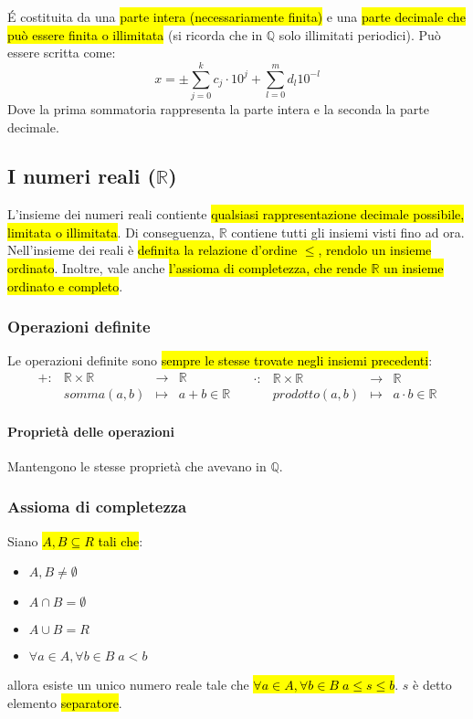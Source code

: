 \'E costituita da una \hl{parte intera (necessariamente finita)} e una \hl{parte
decimale che può essere finita o illimitata} (si ricorda che in $\mathbb{Q}$ solo
illimitati periodici). Può essere scritta come:
\[ x = \pm \sum_{j=0}^k c_j \cdot 10^j + \sum_{l=0}^m d_l 10^{-l} \]
Dove la prima sommatoria rappresenta la parte intera e la seconda la parte 
decimale.

\subsection{I numeri reali ($\mathbb{R}$)}
L'insieme dei numeri reali contiente \hl{qualsiasi rappresentazione decimale
possibile, limitata o illimitata}. Di conseguenza, $\mathbb{R}$ contiene tutti
gli insiemi visti fino ad ora. Nell'insieme dei reali è \hl{definita la relazione
d'ordine $\leq$, rendolo un insieme ordinato}. Inoltre, vale anche \hl{l'assioma
di completezza, che rende $\mathbb{R}$ un insieme ordinato e completo}.

\subsubsection{Operazioni definite}
Le operazioni definite sono \hl{sempre le stesse trovate negli insiemi precedenti}:
\[
    \begin{array}{cccc}
        +: &\mathbb{R} \times \mathbb{R} &\to &\mathbb{R} \\
        &somma(a,b) &\mapsto & a + b \in \mathbb{R}
    \end{array} \quad
    \begin{array}{cccc}
        \cdot: &\mathbb{R} \times \mathbb{R} &\to &\mathbb{R} \\
        &prodotto(a,b) &\mapsto & a \cdot b \in \mathbb{R}
    \end{array}
\]

\paragraph{Proprietà delle operazioni} Mantengono le stesse proprietà che 
avevano in $\mathbb{Q}$.

\subsubsection{Assioma di completezza}
Siano \hl{$A, B \subseteq R$ tali che}:
\begin{itemize}
    \item $A,B \neq \emptyset$
    \item $A \cap B = \emptyset$ 
    \item $A \cup B = R$
    \item $\forall a \in A, \forall b \in B \; a < b$ 
\end{itemize}
allora esiste un unico numero reale tale che 
\hl{$\forall a \in A, \forall b \in B \; a \leq s \leq b$}. $s$ è detto elemento 
\hl{separatore}. 

